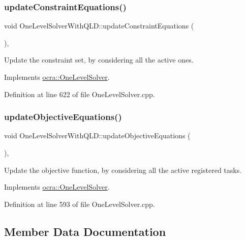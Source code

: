 \subsubsection{\texorpdfstring{update\+Constraint\+Equations()}{updateConstraintEquations()}}
{\footnotesize\ttfamily void One\+Level\+Solver\+With\+Q\+L\+D\+::update\+Constraint\+Equations (\begin{DoxyParamCaption}{ }\end{DoxyParamCaption})\hspace{0.3cm}{\ttfamily [protected]}, {\ttfamily [virtual]}}

Update the constraint set, by considering all the active ones. 

Implements \hyperlink{classocra_1_1OneLevelSolver_af592dc713af6cf22e67abcdfba09ca5e}{ocra\+::\+One\+Level\+Solver}.



Definition at line 622 of file One\+Level\+Solver.\+cpp.

\hypertarget{classocra_1_1OneLevelSolverWithQLD_a23556b4af1bdbead4ecb242991dbd175}{}\label{classocra_1_1OneLevelSolverWithQLD_a23556b4af1bdbead4ecb242991dbd175} 
\subsubsection{\texorpdfstring{update\+Objective\+Equations()}{updateObjectiveEquations()}}
{\footnotesize\ttfamily void One\+Level\+Solver\+With\+Q\+L\+D\+::update\+Objective\+Equations (\begin{DoxyParamCaption}{ }\end{DoxyParamCaption})\hspace{0.3cm}{\ttfamily [protected]}, {\ttfamily [virtual]}}

Update the objective function, by considering all the active registered tasks. 

Implements \hyperlink{classocra_1_1OneLevelSolver_a150b377a35e30ae9c347147c10fddb33}{ocra\+::\+One\+Level\+Solver}.



Definition at line 593 of file One\+Level\+Solver.\+cpp.



\subsection{Member Data Documentation}
\hypertarget{classocra_1_1OneLevelSolverWithQLD_aa7fbbc63b0e6654166aedee4c067af26}{}\label{classocra_1_1OneLevelSolverWithQLD_aa7fbbc63b0e6654166aedee4c067af26} 
